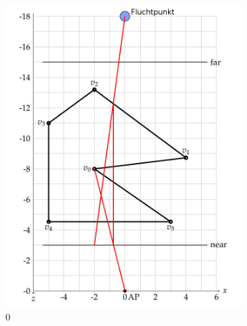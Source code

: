\documentclass[a4paper,10pt,DIV=14]{article}
\begin{document}
\subsection{} %
\begin{figure}[H]
	\captionsetup{justification=centering}
	\begin{subfigure}{0.3\textwidth}
		\includegraphics[width=\textwidth]{2b_0}
		\caption{0}
	\end{subfigure}
	~
	\begin{subfigure}{0.3\textwidth}

\end{subfigure}
\end{figure}
\end{document}
